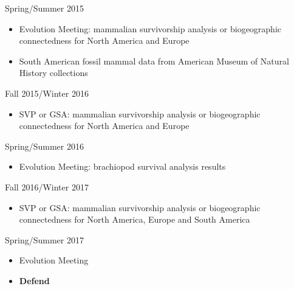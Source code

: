 \documentclass[12pt,letterpaper]{article}
\begin{document}
Spring/Summer 2015
\begin{itemize}
  \item Evolution Meeting: mammalian survivorship analysis or biogeographic connectedness for North America and Europe
  \item South American fossil mammal data from American Museum of Natural History collections
\end{itemize}

Fall 2015/Winter 2016
\begin{itemize}
  \item SVP or GSA: mammalian survivorship analysis or biogeographic connectedness for North America and Europe
\end{itemize}

Spring/Summer 2016
\begin{itemize}
  \item Evolution Meeting: brachiopod survival analysis results
\end{itemize}

Fall 2016/Winter 2017
\begin{itemize}
  \item SVP or GSA: mammalian survivorship analysis or biogeographic connectedness for North America, Europe and South America
\end{itemize}

Spring/Summer 2017
\begin{itemize}
  \item Evolution Meeting
  \item \textbf{Defend}
\end{itemize}



\clearpage


\end{document}

